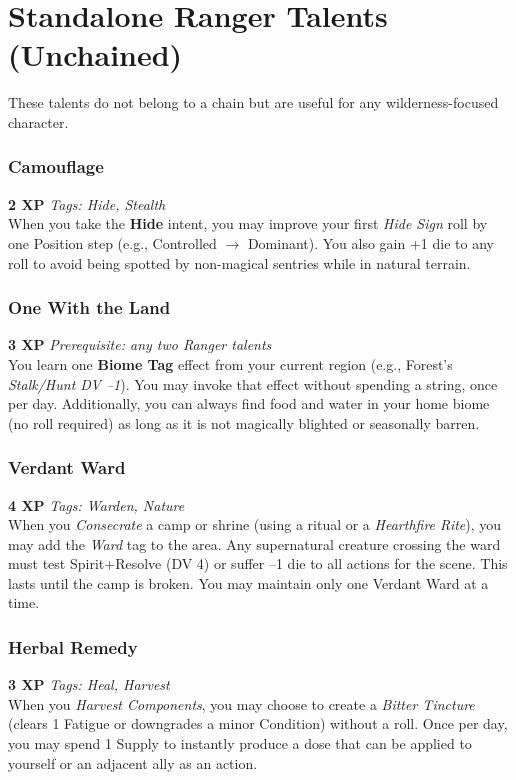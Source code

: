 \documentclass[11pt]{article}
\begin{document}
\section{Standalone Ranger Talents (Unchained)}

These talents do not belong to a chain but are useful for any wilderness-focused character.

\subsubsection{Camouflage}
\textbf{2 XP} \hfill \textit{Tags: Hide, Stealth}\\
When you take the \textbf{Hide} intent, you may improve your first \emph{Hide Sign} roll by one Position step (e.g., Controlled $\to$ Dominant). You also gain +1 die to any roll to avoid being spotted by non-magical sentries while in natural terrain.

\subsubsection{One With the Land}
\textbf{3 XP} \hfill \textit{Prerequisite: any two Ranger talents}\\
You learn one \textbf{Biome Tag} effect from your current region (e.g., Forest's \emph{Stalk/Hunt DV --1}). You may invoke that effect without spending a string, once per day. Additionally, you can always find food and water in your home biome (no roll required) as long as it is not magically blighted or seasonally barren.

\subsubsection{Verdant Ward}
\textbf{4 XP} \hfill \textit{Tags: Warden, Nature}\\
When you \emph{Consecrate} a camp or shrine (using a ritual or a \emph{Hearthfire Rite}), you may add the \emph{Ward} tag to the area. Any supernatural creature crossing the ward must test Spirit+Resolve (DV 4) or suffer --1 die to all actions for the scene. This lasts until the camp is broken. You may maintain only one Verdant Ward at a time.

\subsubsection{Herbal Remedy}
\textbf{3 XP} \hfill \textit{Tags: Heal, Harvest}\\
When you \emph{Harvest Components}, you may choose to create a \emph{Bitter Tincture} (clears 1 Fatigue or downgrades a minor Condition) without a roll. Once per day, you may spend 1 Supply to instantly produce a dose that can be applied to yourself or an adjacent ally as an action.
\end{document}
